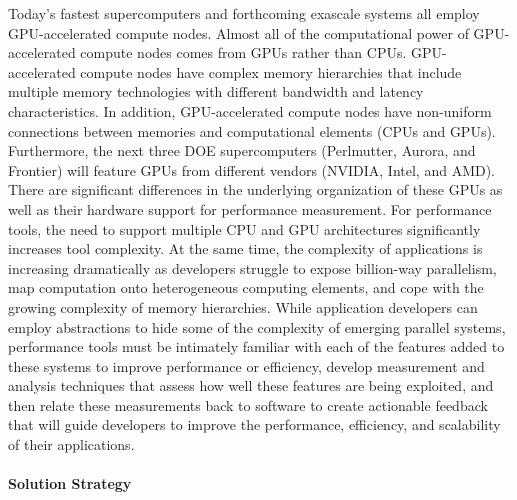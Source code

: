 Today's fastest supercomputers and forthcoming exascale systems all
employ GPU-accelerated compute nodes. Almost all of the 
computational power of GPU-accelerated compute nodes comes from GPUs rather than CPUs.
GPU-accelerated compute nodes have complex memory hierarchies that include 
multiple memory technologies with different bandwidth and latency characteristics. In addition, 
GPU-accelerated compute nodes have non-uniform connections between memories and computational elements (CPUs and GPUs). 
Furthermore, the next three DOE supercomputers (Perlmutter, Aurora, and Frontier) will feature GPUs from different vendors (NVIDIA, Intel, and AMD). 
There are significant differences in the underlying organization of these GPUs as well as their hardware support for performance measurement. For
performance tools, the need to support multiple CPU and GPU architectures significantly increases tool complexity.  At the same time, the
complexity of applications is increasing dramatically as developers
struggle to expose billion-way parallelism, map computation onto
heterogeneous computing elements, and cope with the growing complexity
of memory hierarchies. While application developers can employ
abstractions to hide some of the complexity of emerging parallel
systems, performance tools must be intimately familiar with each of
the features added to these systems to improve performance or
efficiency, develop measurement and analysis techniques that assess
how well these features are being exploited, and then relate these
measurements back to software to create actionable feedback that will
guide developers to improve the performance, efficiency, and
scalability of their applications.

\paragraph{Solution Strategy}

